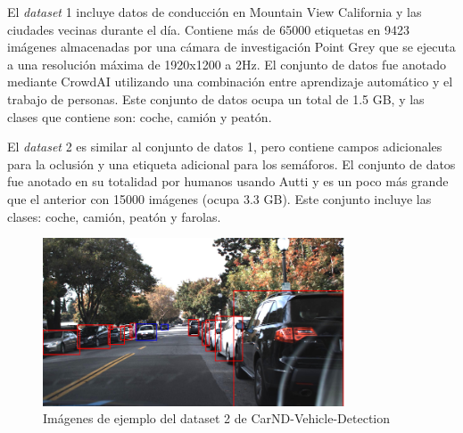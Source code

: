 El \textit{dataset} 1 incluye datos de conducción en Mountain View California y las ciudades vecinas durante el día. Contiene más de 65000 etiquetas en 9423 imágenes almacenadas por una cámara de investigación Point Grey que se ejecuta a una resolución máxima de 1920x1200 a 2Hz. El conjunto de datos fue anotado mediante CrowdAI utilizando una combinación entre aprendizaje automático y el trabajo de personas. Este conjunto de datos ocupa un total de 1.5 GB, y las clases que contiene son: coche, camión y peatón.

El \textit{dataset} 2 es similar al conjunto de datos 1, pero contiene campos adicionales para la oclusión y una etiqueta adicional para los semáforos. El conjunto de datos fue anotado en su totalidad por humanos usando Autti y es un poco más grande que el anterior con 15000 imágenes (ocupa 3.3 GB). Este conjunto incluye las clases: coche, camión, peatón y farolas.
\begin{figure}[H] 
\begin{center}
	\includegraphics[width=0.8\textwidth]{figures/Estado_arte/carnd_dataset2.png}
   \caption{Imágenes de ejemplo del dataset 2 de CarND-Vehicle-Detection}
	\label{fig.carnd}
\end{center}
\end{figure}
